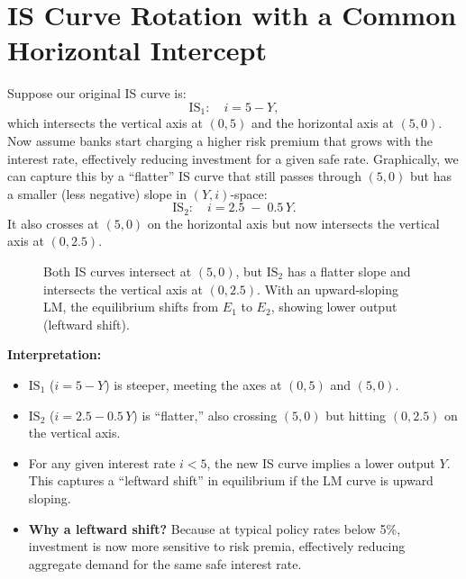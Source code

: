 \section*{IS Curve Rotation with a Common Horizontal Intercept}
Suppose our original IS curve is:
\[
\text{IS}_1:\quad i = 5 - Y,
\]
which intersects the vertical axis at \((0,5)\) and the horizontal axis at \((5,0)\). 
Now assume banks start charging a higher risk premium that grows with the interest rate, effectively reducing investment for a given safe rate.  Graphically, we can capture this by a “flatter” IS curve that still passes through \((5,0)\) but has a smaller (less negative) slope in \((Y,i)\)-space:
\[
\text{IS}_2:\quad i = 2.5 \;-\; 0.5\,Y.
\]
It also crosses at \((5,0)\) on the horizontal axis but now intersects the vertical axis at \((0,2.5)\).  
\begin{figure}[h!]
    \centering
    \caption{Both IS curves intersect at $(5,0)$, but $\text{IS}_2$ has a flatter slope 
    and intersects the vertical axis at $(0,2.5)$. 
    With an upward-sloping LM, the equilibrium shifts from $E_1$ to $E_2$, 
    showing lower output (leftward shift).}
\end{figure}
\noindent
\textbf{Interpretation:}
\begin{itemize}
    \item \(\text{IS}_1\) (\(i = 5 - Y\)) is steeper, meeting the axes at \((0,5)\) and \((5,0)\).
    \item \(\text{IS}_2\) (\(i = 2.5 - 0.5\,Y\)) is “flatter,” also crossing \((5,0)\) but hitting \((0,2.5)\) on the vertical axis.
    \item For any given interest rate \(i < 5\), the new IS curve implies a lower output \(Y\). This captures a “leftward shift” in equilibrium if the LM curve is upward sloping.
    \item \textbf{Why a leftward shift?} Because at typical policy rates below 5\%, investment is now more sensitive to risk premia, effectively reducing aggregate demand for the same safe interest rate.
\end{itemize}
